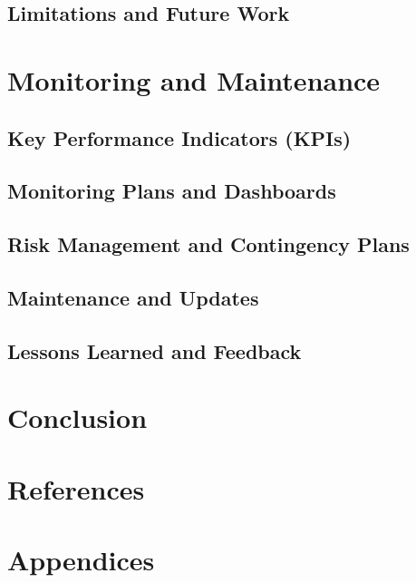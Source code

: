 \documentclass[11pt,a4paper]{article}
\begin{document}
\subsection{Limitations and Future Work}


\section{Monitoring and Maintenance}

\subsection{Key Performance Indicators (KPIs)}

\subsection{Monitoring Plans and Dashboards}

\subsection{Risk Management and Contingency Plans}

\subsection{Maintenance and Updates}

\subsection{Lessons Learned and Feedback}


\section{Conclusion}

\section{References}

\section{Appendices}
\end{document}
